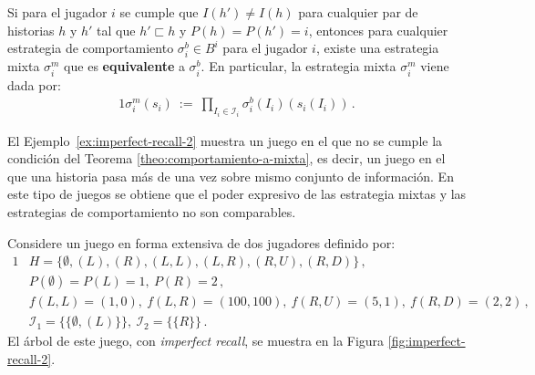 \begin{theorem}
\label{theo:comportamiento-a-mixta}
Si para el jugador $i$ se cumple que $I(h')\neq I(h)$ para cualquier
par de historias $h$ y $h'$ tal que $h'\sqsubset h$ y $P(h)=P(h')=i$, entonces para cualquier estrategia de comportamiento $\sigma^b_i \in B^i$ para el jugador $i$, existe una estrategia mixta $\sigma^m_i$ que es \textbf{equivalente} a $\sigma^b_i$. En particular, la estrategia mixta $\sigma^m_i$ viene dada por:
\begin{alignat}{1}
\sigma^m_i(s_i)\ :=\ \prod_{I_i \in \mathcal{I}_i} \sigma^b_i(I_i)(s_i(I_i)) \,. \label{eq:comportamiento-a-mixta}
\end{alignat}
\end{theorem}

El Ejemplo~\ref{ex:imperfect-recall-2} muestra un juego en el que no se cumple la condición del Teorema \ref{theo:comportamiento-a-mixta}, es decir, un juego en el que una historia pasa más de una vez sobre mismo conjunto de información. En este tipo de juegos se obtiene que el poder expresivo de las estrategia mixtas y las estrategias de comportamiento no son comparables.

\begin{example}
\label{ex:imperfect-recall-2}
Considere un juego en forma extensiva de dos jugadores definido por:
\begin{alignat}{1}
    &H = \{ \emptyset, (L), (R), (L,L), (L,R), (R, U), (R, D)\} \,, \\
    &P(\emptyset) = P(L) = 1, \ P(R) = 2 \,, \\
    &f(L, L) = (1, 0), \ f(L, R) = (100, 100), \ f(R, U) = (5, 1), \ f(R, D) = (2, 2) \,, \\
    &\mathcal{I}_1 = \{ \{ \emptyset, (L)\} \}, \ \mathcal{I}_2 = \{ \{ R \} \} \,.
\end{alignat}
El árbol de este juego, con \textit{imperfect recall}, se muestra en la Figura \ref{fig:imperfect-recall-2}.
\end{example}


